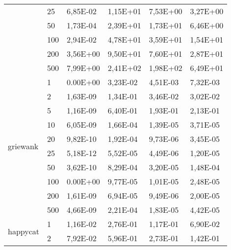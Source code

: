 \begin{longtable}[c]{|p{3.5cm}|l|l|l|l|l|}
                                        & 25        & 6,85E-02   & 1,15E+01   & 7,53E+00   & 3,27E+00  \\ \cline{2-6} 
                                        & 50        & 1,73E-04   & 2,39E+01   & 1,73E+01   & 6,46E+00  \\ \cline{2-6} 
                                        & 100       & 2,94E-02   & 4,78E+01   & 3,59E+01   & 1,54E+01  \\ \cline{2-6} 
                                        & 200       & 3,56E+00   & 9,50E+01   & 7,60E+01   & 2,87E+01  \\ \cline{2-6} 
                                        & 500       & 7,99E+00   & 2,41E+02   & 1,98E+02   & 6,49E+01  \\ \hline
\multirow[t]{10}{*}{griewank}              & 1         & 0.00E+00   & 3,23E-02   & 4,51E-03   & 7,32E-03  \\ \cline{2-6} 
                                        & 2         & 1,63E-09   & 1,34E-01   & 3,46E-02   & 3,02E-02  \\ \cline{2-6} 
                                        & 5         & 1,16E-09   & 6,40E-01   & 1,93E-01   & 2,13E-01  \\ \cline{2-6} 
                                        & 10        & 6,05E-09   & 1,66E-04   & 1,39E-05   & 3,71E-05  \\ \cline{2-6} 
                                        & 20        & 9,82E-10   & 1,92E-04   & 9,73E-06   & 3,45E-05  \\ \cline{2-6} 
                                        & 25        & 5,18E-12   & 5,52E-05   & 4,49E-06   & 1,20E-05  \\ \cline{2-6} 
                                        & 50        & 3,62E-10   & 8,29E-04   & 3,20E-05   & 1,48E-04  \\ \cline{2-6} 
                                        & 100       & 0.00E+00   & 9,77E-05   & 1,01E-05   & 2,48E-05  \\ \cline{2-6} 
                                        & 200       & 1,61E-09   & 6,94E-05   & 9,49E-06   & 2,00E-05  \\ \cline{2-6} 
                                        & 500       & 4,66E-09   & 2,21E-04   & 1,83E-05   & 4,42E-05  \\ \hline
\multirow[t]{10}{*}{happycat}              & 1         & 1,16E-02   & 2,76E-01   & 1,17E-01   & 6,90E-02  \\ \cline{2-6} 
                                        & 2         & 7,92E-02   & 5,96E-01   & 2,73E-01   & 1,42E-01  \\ \cline{2-6} 

\end{longtable}
